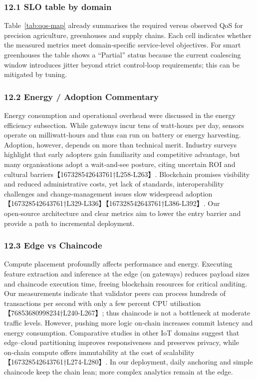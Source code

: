 \subsubsection*{12.1 SLO table by domain}
Table~\ref{tab:qos-map} already summarises the required versus observed QoS for precision agriculture, greenhouses and supply chains.  Each cell indicates whether the measured metrics meet domain‑specific service‑level objectives.  For smart greenhouses the table shows a ``Partial'' status because the current coalescing window introduces jitter beyond strict control‑loop requirements; this can be mitigated by tuning.

\subsubsection*{12.2 Energy / Adoption Commentary}
Energy consumption and operational overhead were discussed in the energy efficiency subsection.  While gateways incur tens of watt‑hours per day, sensors operate on milliwatt‑hours and thus can run on battery or energy harvesting.  Adoption, however, depends on more than technical merit.  Industry surveys highlight that early adopters gain familiarity and competitive advantage, but many organisations adopt a wait‑and‑see posture, citing uncertain ROI and cultural barriers【167328542643761†L258-L263】.  Blockchain promises visibility and reduced administrative costs, yet lack of standards, interoperability challenges and change‑management issues slow widespread adoption【167328542643761†L329-L336】【167328542643761†L386-L392】.  Our open‑source architecture and clear metrics aim to lower the entry barrier and provide a path to incremental deployment.

\subsubsection*{12.3 Edge vs Chaincode}
Compute placement profoundly affects performance and energy.  Executing feature extraction and inference at the edge (on gateways) reduces payload sizes and chaincode execution time, freeing blockchain resources for critical auditing.  Our measurements indicate that validator peers can process hundreds of transactions per second with only a few percent CPU utilisation【76853680998234†L240-L267】; thus chaincode is not a bottleneck at moderate traffic levels.  However, pushing more logic on‑chain increases commit latency and energy consumption.  Comparative studies in other IoT domains suggest that edge–cloud partitioning improves responsiveness and preserves privacy, while on‑chain compute offers immutability at the cost of scalability【167328542643761†L274-L280】.  In our deployment, daily anchoring and simple chaincode keep the chain lean; more complex analytics remain at the edge.

